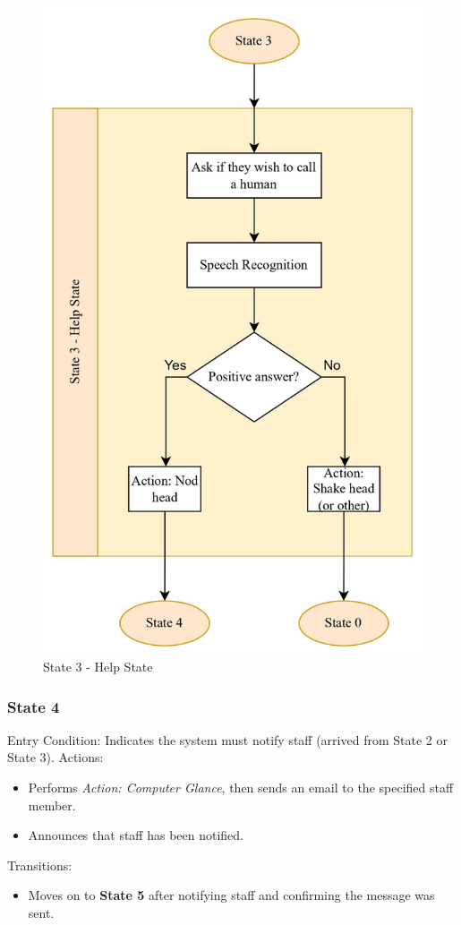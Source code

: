 \documentclass[conference]{IEEEtran}
\begin{document}
\begin{figure}
    \centering
    \includegraphics[width=.6\linewidth]{State 3 - Help State.jpg}
    \caption{State 3 - Help State}
    \label{State 3 - Help State}
\end{figure}

\subsubsection{State 4}
Entry Condition:
Indicates the system must notify staff (arrived from State 2 or State 3).
Actions:
\begin{itemize}
  \item Performs \emph{Action: Computer Glance}, then sends an email to the specified staff member.
  \item Announces that staff has been notified.
\end{itemize}
Transitions:
\begin{itemize}
  \item Moves on to \textbf{State 5} after notifying staff and confirming the message was sent.
\end{itemize}
\end{document}
